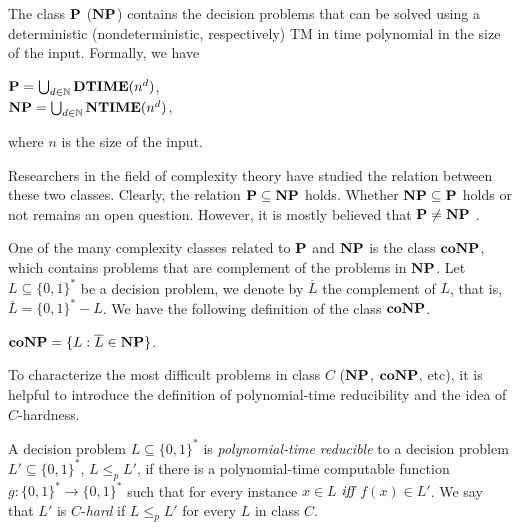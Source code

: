 \begin{definition}
	The class $\textbf{P}$ ($\textbf{NP}$) contains the decision problems that can be solved using a 
	deterministic (nondeterministic, respectively) TM 
	in time polynomial in the size of the input.  Formally, we have
	\begin{center}
		$\textbf{P} = \bigcup_{d \in \mathbb{N}} \textbf{DTIME}(n^d)$,\\
		$\textbf{NP} = \bigcup_{d \in \mathbb{N}} \textbf{NTIME}(n^d)$,
	\end{center}
	where $n$ is the size of the input.
\end{definition}

Researchers in the field of complexity theory have studied
the relation between these two classes.
Clearly, the relation $\textbf{P} \subseteq \textbf{NP}$ holds. Whether
$\textbf{NP} \subseteq \textbf{P}$ holds or not remains an open question.
However, it is mostly believed that $\textbf{P} \not = \textbf{NP}$ \cite{gasarch2002p}. 


One of the many complexity classes related to $\textbf{P}$ and $\textbf{NP}$ \cite{gasarch2002p}
is the class $\textbf{coNP}$, which contains problems that are complement of 
the problems in $\textbf{NP}$.
Let $L \subseteq \{0,1\}^*$ be a decision problem, we denote by $\overline{L}$ the
complement of $L$, that is, $\overline{L} = \{0,1\}^*-L$.
We have the following definition of the class $\textbf{coNP}$.

\begin{definition}
	$\textbf{coNP} = \{L : \overline{L} \in \textbf{NP}\}$.
\end{definition}

To characterize the most difficult problems in class $C$ ($\textbf{NP}$, $\textbf{coNP}$, etc), 
it is helpful to introduce
the definition of polynomial-time reducibility \cite{gasarch2002p} and the 
idea of $C$-hardness.

\begin{definition}
	A decision problem $L \subseteq \{0,1\}^*$  is \textit{polynomial-time reducible} to
	a decision problem $L' \subseteq \{0,1\}^*$, $L \leq_p L'$, if there is a
	polynomial-time computable function $g : \{0,1\}^* \rightarrow \{0,1\}^*$
	such that for every instance $x \in L$ $\textit{iff}$ $f(x) \in L'$.
	We say that $L'$ is $C$-\textit{hard} if $L \leq_p L'$ for every $L$ in class $C$.
\end{definition}


